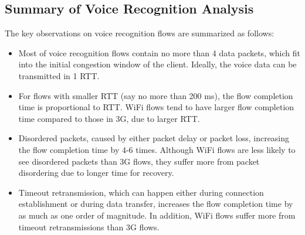 \subsection{Summary of Voice Recognition Analysis}

The key observations on voice recognition flows are summarized as follows:
\begin{itemize}
\item Most of voice recognition flows contain no more than 4 data packets, which fit into the initial congestion window of the client. Ideally, the voice data can be transmitted in 1 RTT.
\item For flows with smaller RTT (say no more than 200 ms), the flow completion time is proportional to RTT. WiFi flows tend to have larger flow completion time compared to those in 3G, due to larger RTT. 	
\item Disordered packets, caused by either packet delay or packet loss, increasing the flow completion time by 4-6 times. Although WiFi flows are less likely to see disordered packets than 3G flows, they suffer more from packet disordering due to longer time for recovery.
\item Timeout retransmission, which can happen either during connection establishment or during data transfer, increases the flow completion time by as much as one order of magnitude. In addition, WiFi flows suffer more from timeout retransmissions than 3G flows.
\end{itemize}